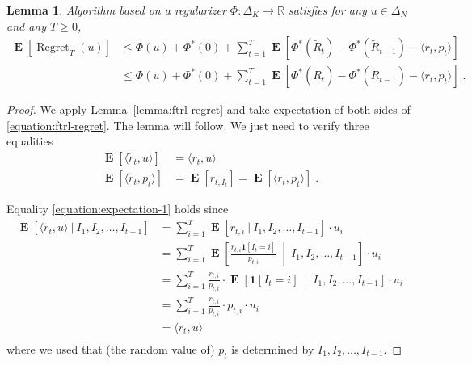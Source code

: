 \documentclass[12pt]{article}
\newtheorem{lemma}{Lemma}
\newcommand{\R}{\mathbb{R}}
\newcommand{\indicator}{\mathbf{1}}
\DeclareMathOperator{\Regret}{Regret}
\DeclareMathOperator{\Exp}{\mathbf{E}}
\begin{document}
\begin{lemma}
\label{lemma:ftrl-expected-regret}
Algorithm based on a regularizer $\Phi:\Delta_K \to \R$ satisfies
for any $u \in \Delta_N$ and any $T \ge 0$,
\begin{align*}
\Exp[\Regret_T(u)]
& \le \Phi(u) + \Phi^*(0) + \sum_{t=1}^T \Exp\left[\Phi^* \left(\widetilde R_t\right) - \Phi^*\left(\widetilde R_{t-1}\right) - \langle \widetilde r_t, p_t \rangle \right] \\
& \le \Phi(u) + \Phi^*(0) + \sum_{t=1}^T \Exp\left[\Phi^* \left(\widetilde R_t\right) - \Phi^*\left(\widetilde R_{t-1}\right) - \langle r_t, p_t \rangle \right] \; .
\end{align*}
\end{lemma}

\begin{proof}
We apply Lemma~\ref{lemma:ftrl-regret} and take expectation of both sides of \eqref{equation:ftrl-regret}.
The lemma will follow. We just need to verify three equalities
\begin{align}
\Exp[\langle \widetilde r_t, u \rangle] & = \langle r_t, u \rangle \label{equation:expectation-1} \\
\Exp[\langle \widetilde r_t, p_t \rangle] & = \Exp[r_{t,I_t}] = \Exp[\langle r_t, p_t \rangle] \label{equation:expectation-2} \; .
\end{align}

Equality \eqref{equation:expectation-1} holds since
\begin{align*}
\Exp[\langle \widetilde r_t, u \rangle ~|~ I_1, I_2, \dots, I_{t-1}]
& = \sum_{i=1}^T \Exp[\widetilde r_{t,i} ~|~ I_1, I_2, \dots, I_{t-1} ] \cdot u_i \\
& = \sum_{i=1}^T \Exp\left[  \frac{r_{t,i} \indicator[I_t=i]}{p_{t,i}} ~\middle|~ I_1, I_2, \dots, I_{t-1} \right] \cdot u_i \\
& = \sum_{i=1}^T \frac{r_{t,i}}{p_{t,i}} \cdot \Exp\left[ \indicator[I_t=i] ~\middle|~ I_1, I_2, \dots, I_{t-1} \right] \cdot u_i \\
& = \sum_{i=1}^T \frac{r_{t,i}}{p_{t,i}} \cdot p_{t,i}  \cdot u_i \\
& = \langle r_t, u \rangle \\
\end{align*}
where we used that (the random value of) $p_t$ is determined by $I_1, I_2, \dots, I_{t-1}$.


\end{proof}
\end{document}
